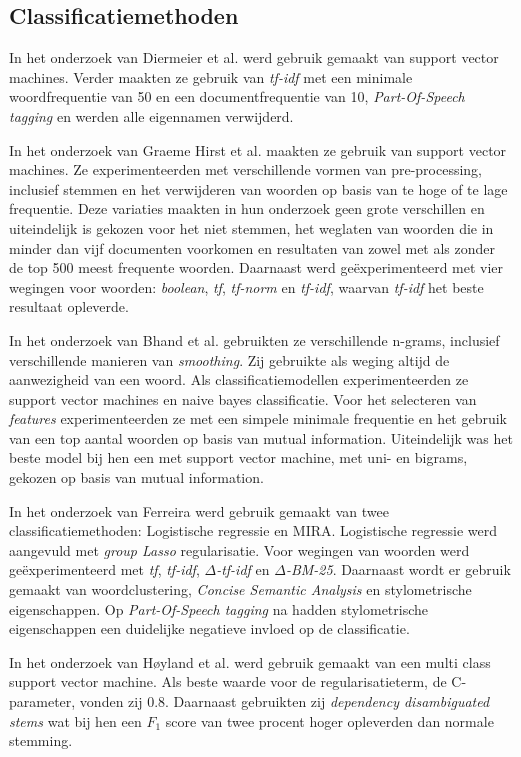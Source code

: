 \subsection{Classificatiemethoden}
\label{sec:Deelvraag1}
In het onderzoek van Diermeier et al. werd gebruik gemaakt van support vector machines. Verder maakten ze gebruik van \textit{tf-idf} met een minimale woordfrequentie van 50 en een documentfrequentie van 10, \textit{Part-Of-Speech tagging} en werden alle eigennamen verwijderd.\par
In het onderzoek van Graeme Hirst et al. maakten ze gebruik van support vector machines\cite{Hirst_textto}. Ze experimenteerden met verschillende vormen van pre-processing, inclusief stemmen en het verwijderen van woorden op basis van te hoge of te lage frequentie. Deze variaties maakten in hun onderzoek geen grote verschillen en uiteindelijk is gekozen voor het niet stemmen, het weglaten van woorden die in minder dan vijf documenten voorkomen en resultaten van zowel met als zonder de top 500 meest frequente woorden. Daarnaast werd geëxperimenteerd met vier wegingen voor woorden: \textit{boolean}, \textit{tf}, \textit{tf-norm} en \textit{tf-idf}, waarvan \textit{tf-idf} het beste resultaat opleverde. \par
In het onderzoek van Bhand et al. gebruikten ze verschillende n-grams, inclusief verschillende manieren van \textit{smoothing}\cite{bhand}. Zij gebruikte als weging altijd de aanwezigheid van een woord. Als classificatiemodellen experimenteerden ze support vector machines en naive bayes classificatie. Voor het selecteren van \textit{features} experimenteerden ze met een simpele minimale frequentie en het gebruik van een top aantal woorden op basis van mutual information. Uiteindelijk was het beste model bij hen een met support vector machine, met uni- en bigrams, gekozen op basis van mutual information.\par
In het onderzoek van Ferreira werd gebruik gemaakt van twee classificatiemethoden: Logistische regressie en MIRA\cite{Ferreira2016UsingTT}. Logistische regressie werd aangevuld met \textit{group Lasso} regularisatie. Voor wegingen van woorden werd geëxperimenteerd met \textit{tf}, \textit{tf-idf}, \textit{$\Delta$-tf-idf} en \textit{$\Delta$-BM-25}. Daarnaast wordt er gebruik gemaakt van woordclustering, \textit{Concise Semantic Analysis} en stylometrische eigenschappen. Op \textit{Part-Of-Speech tagging} na hadden stylometrische eigenschappen een duidelijke negatieve invloed op de classificatie.\par
In het onderzoek van Høyland et al. werd gebruik gemaakt van een multi class support vector machine\cite{W14-2516}. Als beste waarde voor de regularisatieterm, de C-parameter, vonden zij 0.8. Daarnaast gebruikten zij \textit{dependency disambiguated
stems} wat bij hen een $F_1$ score van twee procent hoger opleverden dan normale stemming.\par


